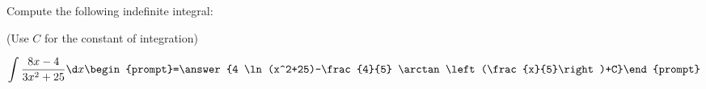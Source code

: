 \documentclass{ximera}
\author{Jim Talamo}
\begin{document}
\begin{exercise}
Compute the following indefinite integral:

\begin{prompt} (Use $C$ for the constant of integration) \end{prompt}

\[
\int \frac{8x-4}{3x^2+25} \d x 
\begin{prompt}=\answer{4 \ln(x^2+25)-\frac{4}{5} \arctan\left(\frac{x}{5}\right)+C}\end{prompt}
\]
\end{exercise}
\end{document}

